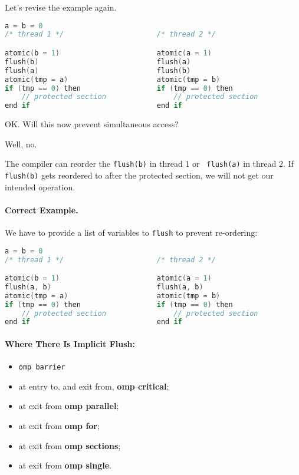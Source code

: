 Let's revise the example again.
  \begin{lstlisting}[language=C]
                    a = b = 0
/* thread 1 */                      /* thread 2 */

atomic(b = 1)                       atomic(a = 1)
flush(b)                            flush(a)
flush(a)                            flush(b)
atomic(tmp = a)                     atomic(tmp = b)
if (tmp == 0) then                  if (tmp == 0) then
    // protected section                // protected section
end if                              end if
  \end{lstlisting}

OK. Will this now prevent simultaneous access?

Well, no.

The compiler can reorder the {\tt flush(b)} in thread 1 or {\tt
  flush(a)} in thread 2. If {\tt flush(b)} gets reordered to after the
protected section, we will not get our intended operation.

\paragraph{Correct Example.} We have to provide a list of variables
to {\tt flush} to prevent re-ordering:
  \begin{lstlisting}[language=C]
                    a = b = 0
/* thread 1 */                      /* thread 2 */

atomic(b = 1)                       atomic(a = 1)
flush(a, b)                         flush(a, b)
atomic(tmp = a)                     atomic(tmp = b)
if (tmp == 0) then                  if (tmp == 0) then
    // protected section                // protected section
end if                              end if
  \end{lstlisting}

\paragraph{Where There Is Implicit Flush:}
  \begin{itemize}[noitemsep]
    \item {\tt omp barrier}
    \item at entry to, and exit from, {\bf omp critical};
    \item at exit from {\bf omp parallel}; 
    \item at exit from {\bf omp for};
    \item at exit from {\bf omp sections};
    \item at exit from {\bf omp single}.
  \end{itemize}

